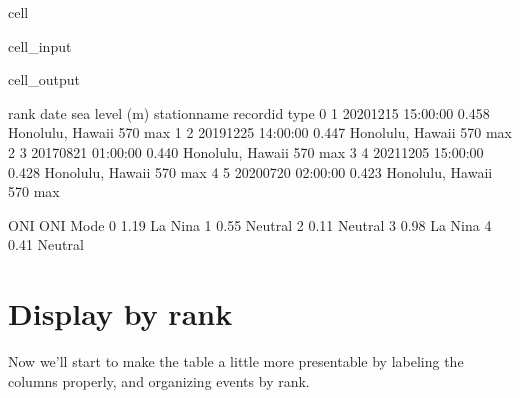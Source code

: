 \documentclass[letterpaper,10pt,english]{jupyterBook}
\begin{document}
\begin{sphinxuseclass}{cell}\begin{sphinxVerbatimInput}

\begin{sphinxuseclass}{cell_input}
\begin{sphinxVerbatim}[commandchars=\\\{\}]
  
\end{sphinxVerbatim}

\end{sphinxuseclass}\end{sphinxVerbatimInput}
\begin{sphinxVerbatimOutput}

\begin{sphinxuseclass}{cell_output}
\begin{sphinxVerbatim}[commandchars=\\\{\}]
   rank                date  sea level (m)      station\PYGZus{}name record\PYGZus{}id type  \PYGZbs{}
0     1 2020\PYGZhy{}12\PYGZhy{}15 15:00:00          0.458  Honolulu, Hawaii       570  max   
1     2 2019\PYGZhy{}12\PYGZhy{}25 14:00:00          0.447  Honolulu, Hawaii       570  max   
2     3 2017\PYGZhy{}08\PYGZhy{}21 01:00:00          0.440  Honolulu, Hawaii       570  max   
3     4 2021\PYGZhy{}12\PYGZhy{}05 15:00:00          0.428  Honolulu, Hawaii       570  max   
4     5 2020\PYGZhy{}07\PYGZhy{}20 02:00:00          0.423  Honolulu, Hawaii       570  max   

    ONI ONI Mode  
0 \PYGZhy{}1.19  La Nina  
1  0.55  Neutral  
2 \PYGZhy{}0.11  Neutral  
3 \PYGZhy{}0.98  La Nina  
4 \PYGZhy{}0.41  Neutral  
\end{sphinxVerbatim}

\end{sphinxuseclass}\end{sphinxVerbatimOutput}

\end{sphinxuseclass}

\chapter{Display by rank}
\label{\detokenize{notebooks/regional_and_local/SL_Rankings_annual:display-by-rank}}
\sphinxAtStartPar
Now we’ll start to make the table a little more presentable by labeling the columns properly, and organizing events by rank.
\end{document}
